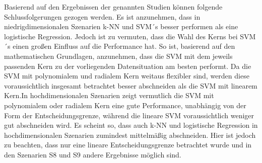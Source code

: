 \documentclass[
]{article}
\begin{document}
Basierend auf den Ergebnissen der genannten Studien können folgende
Schlussfolgerungen gezogen werden. Es ist anzunehmen, dass in
niedrigdimensionalen Szenarien k-NN und SVM´s besser performen als eine
logistische Regression. Jedoch ist zu vermuten, dass die Wahl des Kerns
bei SVM´s einen großen Einfluss auf die Performance hat. So ist,
basierend auf den mathematischen Grundlagen, anzunehmen, dass die SVM
mit dem jeweils passenden Kern zu der vorliegenden Datensituation am
besten performt. Da die SVM mit polynomialem und radialem Kern weitaus
flexibler sind, werden diese voraussichtlich insgesamt betrachtet besser
abschneiden als die SVM mit linearem Kern.\newline In hochdimensionalen
Szenarien zeigt vermutlich die SVM mit polynomialem oder radialem Kern
eine gute Performance, unabhängig von der Form der Entscheidungsgrenze,
während die lineare SVM voraussichtlich weniger gut abschneiden wird. Es
scheint so, dass auch k-NN und logistische Regression in
hochdimensionalen Szenarien zumindest mittelmäßig abschneiden. Hier ist
jedoch zu beachten, dass nur eine lineare Entscheidungsgrenze betrachtet
wurde und in den Szenarien S8 und S9 andere Ergebnisse möglich sind.

\printbibliography
\end{document}
